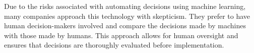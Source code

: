 Due to the risks associated with automating decisions using machine
learning, many companies approach this technology with skepticism. They
prefer to have human decision-makers involved and compare the decisions
made by machines with those made by humans. This approach allows for
human oversight and ensures that decisions are thoroughly evaluated
before implementation.
